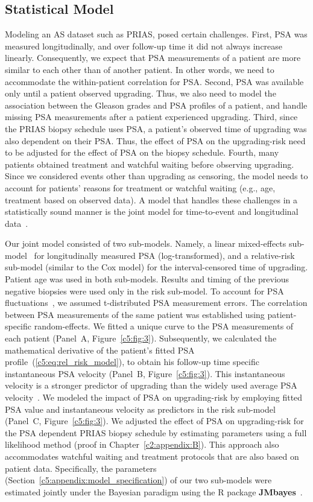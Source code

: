 \subsection{Statistical Model}
Modeling an AS dataset such as PRIAS, posed certain challenges. First, PSA was measured longitudinally, and over follow-up time it did not always increase linearly. Consequently, we expect that PSA measurements of a patient are more similar to each other than of another patient. In other words, we need to accommodate the within-patient correlation for PSA. Second, PSA was available only until a patient observed upgrading. Thus, we also need to model the association between the Gleason grades and PSA profiles of a patient, and handle missing PSA measurements after a patient experienced upgrading. Third, since the PRIAS biopsy schedule uses PSA, a patient's observed time of upgrading was also dependent on their PSA. Thus, the effect of PSA on the upgrading-risk need to be adjusted for the effect of PSA on the biopsy schedule. Fourth, many patients obtained treatment and watchful waiting before observing upgrading. Since we considered events other than upgrading as censoring, the model needs to account for patients' reasons for treatment or watchful waiting (e.g., age, treatment based on observed data). A model that handles these challenges in a statistically sound manner is the joint model for time-to-event and longitudinal data~\citep{tomer2019,coley2017prediction,rizopoulos2012joint}.

Our joint model consisted of two sub-models. Namely, a linear mixed-effects sub-model~\citep{laird1982random} for longitudinally measured PSA (log-transformed), and a relative-risk sub-model (similar to the Cox model) for the interval-censored time of upgrading. Patient age was used in both sub-models. Results and timing of the previous negative biopsies were used only in the risk sub-model. To account for PSA fluctuations~\citep{nixon1997biological}, we assumed t-distributed PSA measurement errors. The correlation between PSA measurements of the same patient was established using patient-specific random-effects. We fitted a unique curve to the PSA measurements of each patient (Panel~A, Figure~\ref{c5:fig:3}). Subsequently, we calculated the mathematical derivative of the patient's fitted PSA profile~(\ref{c5:eq:rel_risk_model}), to obtain his follow-up time specific instantaneous PSA velocity (Panel~B, Figure~\ref{c5:fig:3}). This instantaneous velocity is a stronger predictor of upgrading than the widely used average PSA velocity~\citep{cooperberg2018refined}. We modeled the impact of PSA on upgrading-risk by employing fitted PSA value and instantaneous velocity as predictors in the risk sub-model (Panel~C, Figure~\ref{c5:fig:3}). We adjusted the effect of PSA on upgrading-risk for the PSA dependent PRIAS biopsy schedule by estimating parameters using a full likelihood method (proof in Chapter~\ref{c2:appendix:B}). This approach also accommodates watchful waiting and treatment protocols that are also based on patient data. Specifically, the parameters (Section~\ref{c5:appendix:model_specification}) of our two sub-models were estimated jointly under the Bayesian paradigm using the R package \textbf{JMbayes}~\citep{rizopoulosJMbayes}.

